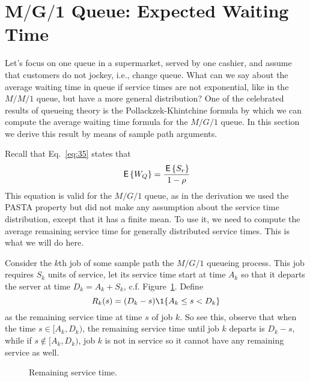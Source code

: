 \section
[$M/G/1$ Queue: Expected Waiting Time]
{$\mathbf{M/G/1}$ Queue: Expected Waiting Time}
\label{sec:mg1}

Let's focus on one queue in a supermarket, served by one cashier, and
assume that customers do not jockey, i.e., change queue. What can we
say about the average waiting time in queue if service times are not
exponential, like in the $M/M/1$ queue, but have a more general
distribution? One of the celebrated results of queueing theory is the
Pollackzek-Khintchine formula by which we can compute the average
waiting time formula for the $M/G/1$ queue. In this section we derive
this result by means of sample path arguments.

Recall that Eq.~\eqref{eq:35} states that
\begin{equation*}
  \,\mathsf{E}\left\{W_Q\right\} = \frac{\,\mathsf{E}\left\{S_r\right\}}{1-\rho}
\end{equation*}
This equation is valid for the $M/G/1$ queue, as in the derivation we
used the PASTA property but did not make any assumption about the
service time distribution, except that it has a finite mean. To use
it, we need to compute the average remaining service time for
generally distributed service times. This is what we will do here.

Consider the $k$th job of some sample path the $M/G/1$ queueing
process. This job requires $S_k$ units of service, let its service
time start at time $A_k$ so that it departs the server at time
$D_k=A_k + S_k$, c.f. Figure~\ref{fig:mg1remainingservicetime}. Define
\begin{equation*}
R_k(s) = (D_k-s)\1{A_k \leq s < D_k}
\end{equation*}
as the remaining service time at time $s$ of job $k$. So see this,
observe that when the time $s\in [A_k, D_k)$, the remaining service
time until job $k$ departs is $D_k-s $, while if
$s\not \in [A_k, D_k)$, job $k$ is not in service so it cannot have
any remaining service as well.

\begin{figure}[ht]
  \centering
{}

  \caption{Remaining service time.}
  \label{fig:mg1remainingservicetime}
\end{figure}


